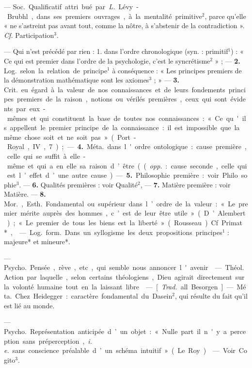 \begin{itemize}[leftmargin=1cm, label=, itemsep=1pt]
 — \si{Soc.} Qualificatif attri
bué par {\it L.} Lévy-Brubhl, dans ses
premiers ouvrages, à la mentalité
primitive$^2$, parce qu'elle « ne s’astreint pas avant tout, comme la
nôtre, à s'abstenir de la contradiction ». {\it Cf.} Participation$^3$.

 — Qui n’est précédé par rien :
1. dans l’ordre chronologique (syn. :
primitif$^1$) : « Ce qui est premier dans
l’ordre de la psychologie, c’est le
syncrétisme$^2$ » ; — {\bf 2.} \si{Log.} selon la
relation de principe$^1$ à conséquence :
« Les principes premiers de la démonstration mathématique sont les
axiomes$^3$ ; » — {\bf 3.} \si{Crit.} eu égard à la
valeur de nos connaissances et de
leurs fondements principes premiers de la raison, notions ou vérilés
premières, ceux qui sont évidents
par eux-mêmes et qui constituent
la base de toutes nos connaissances :
« Ce qu'ils appellent le premier principe de la connaissance : il est impossible que la même chose soit et
ne soit pas » (Port-Royal, IV, 7) ; —
 {\bf 4.} \si{Méta.} dans l'ordre ontologique :
cause première, celle qui se suffit à
elle-même et qui a en elle sa raison
d’être (({\it opp.} : cause seconde, celle qui
est l’effet d’une autre cause). —
 {\bf 5.} Philosophie première : voir Philo
sophie$^3$. — {\bf 6.} Qualités premières :
voir Qualité$^2$, — {\bf 7.} Matière première :
voir Matière. — {\bf 8.} \si{Mor.}, \si{Esth.}
Fondamental ou supérieur dans
l’ordre de la valeur : « Le premier
mérite auprès des hommes, c’est de
leur être utile » (D’Alembert) ; « Le
premier de tous les biens est la
liberté» (Rousseau). Cf Primat*,

 — \si{Log.} \si{form.} Dans un syllogisme les deux propositions principes$^1$ : majeure* et mineure*.

 — \si{Psycho.} Pensée,
rève, etc., qui semble nous annoncer
l'avenir.

 — \si{Théol.} Action
par laquelle, selon certains théologiens, Dieu agirait directement sur
la volonté humaine tout en la laissant libre.

 — [{\it Trad.} all. Besorgen]
— \si{Méta.} Chez Heidegger : caractère
fondamental du Dasein$^2$, qui résulte
du fait qu'il est lié au monde.

 — \si{Psycho.} Représentation anticipée d’un objet : « Nulle
part il n'y a perception sans préperception, {\it i. e.} sans conscience
préalable d’un schéma intuitif. »
(Le Roy).

 — Voir Cogito$^3$.


\end{itemize}
